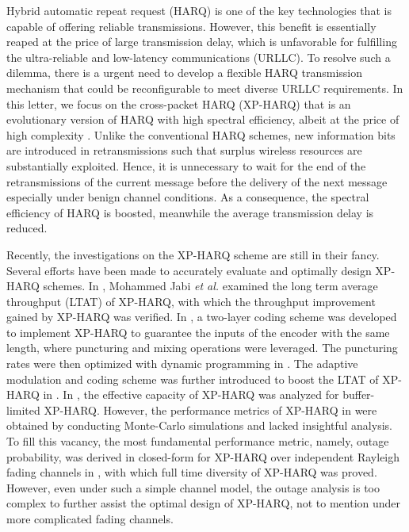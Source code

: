 \documentclass[lettersize,journal]{IEEEtran}
\begin{document}
Hybrid automatic repeat request (HARQ) is one of the key technologies that is capable of offering reliable transmissions. However, this benefit is essentially reaped at the price of large transmission delay, %
which is unfavorable for fulfilling the ultra-reliable and low-latency communications (URLLC). %
To resolve such a dilemma, there is a urgent need to develop a flexible HARQ transmission mechanism that could be reconfigurable to meet diverse URLLC requirements. In this letter, we focus on the cross-packet HARQ (XP-HARQ) that is an evolutionary version of HARQ with high spectral efficiency, albeit at the price of high complexity \cite{jabi2017adaptive,jabi2017boost,jabi2018amc}. Unlike the conventional HARQ schemes, new information bits are introduced in retransmissions such that surplus wireless resources are substantially exploited. Hence, it is unnecessary to wait for the end of the retransmissions of the current message before the delivery of the next message especially under benign channel conditions. As a consequence, the spectral efficiency of HARQ is boosted, meanwhile the average transmission delay is reduced.

Recently, the investigations on the XP-HARQ scheme are still in their fancy. Several efforts have been made to accurately evaluate and optimally design XP-HARQ schemes. In \cite{jabi2017adaptive}, Mohammed Jabi {\emph {et al.}} examined the long term average throughput (LTAT) of XP-HARQ, with which the throughput improvement gained by XP-HARQ was verified. In \cite{jabi2017boost}, a two-layer coding scheme was developed to implement XP-HARQ to guarantee the inputs of the encoder with the same length, where puncturing and mixing operations were leveraged. The puncturing rates were then optimized with dynamic programming in \cite{jabi2017boost}. The adaptive modulation and coding scheme was further introduced to boost the LTAT of XP-HARQ in \cite{jabi2018amc}. In \cite{shi2019effective}, the effective capacity of XP-HARQ was analyzed for buffer-limited XP-HARQ. However, the performance metrics of XP-HARQ in \cite{jabi2017adaptive,jabi2017boost,jabi2018amc,shi2019effective} were obtained by conducting Monte-Carlo simulations and lacked insightful analysis. To fill this vacancy, the most fundamental performance metric, namely, outage probability, was derived in closed-form for XP-HARQ over independent Rayleigh fading channels in \cite{9768121}, with which full time diversity of XP-HARQ was proved. However, even under such a simple channel model, the outage analysis is too complex to further assist the optimal design of XP-HARQ, not to mention under more complicated fading channels.
\end{document}
